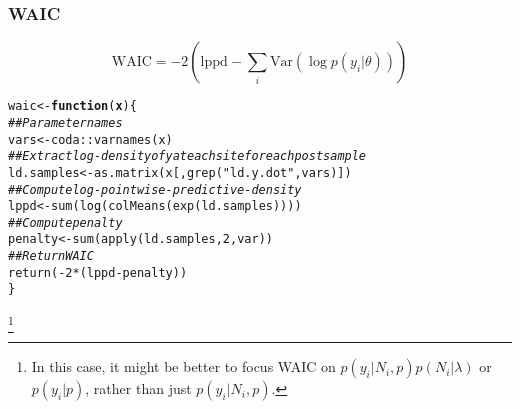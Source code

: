 \documentclass[color=usenames,dvipsnames]{beamer}\usepackage[]{graphicx}\usepackage[]{color}
\makeatletter
\newcommand{\hlnum}[1]{\textcolor[rgb]{0.69,0.494,0}{#1}}%
\newcommand{\hlstr}[1]{\textcolor[rgb]{0.749,0.012,0.012}{#1}}%
\newcommand{\hlcom}[1]{\textcolor[rgb]{0.514,0.506,0.514}{\textit{#1}}}%
\newcommand{\hlopt}[1]{\textcolor[rgb]{0,0,0}{#1}}%
\newcommand{\hlstd}[1]{\textcolor[rgb]{0,0,0}{#1}}%
\newcommand{\hlkwa}[1]{\textcolor[rgb]{0,0,0}{\textbf{#1}}}%
\newcommand{\hlkwb}[1]{\textcolor[rgb]{0,0.341,0.682}{#1}}%
\newcommand{\hlkwc}[1]{\textcolor[rgb]{0,0,0}{\textbf{#1}}}%
\newcommand{\hlkwd}[1]{\textcolor[rgb]{0.004,0.004,0.506}{#1}}%
\newenvironment{kframe}{%
 \def\at@end@of@kframe{}%
 \ifinner\ifhmode%
  \def\at@end@of@kframe{\end{minipage}}%
  \begin{minipage}{\columnwidth}%
 \fi\fi%
 \def\FrameCommand##1{\hskip\@totalleftmargin \hskip-\fboxsep
 \colorbox{shadecolor}{##1}\hskip-\fboxsep
     \hskip-\linewidth \hskip-\@totalleftmargin \hskip\columnwidth}%
 \MakeFramed {\advance\hsize-\width
   \@totalleftmargin\z@ \linewidth\hsize
   \@setminipage}}%
 {\par\unskip\endMakeFramed%
 \at@end@of@kframe}
\newenvironment{knitrout}{}{} %
\makeatother
\begin{document}
\bgroup
\let\oldfootnoterule\footnoterule
\def\footnoterule{\only<2->\oldfootnoterule}
\begin{frame}[fragile]
  \frametitle{WAIC}
  \[
    \mathrm{WAIC} = -2(\mathrm{lppd} - \sum_i \mathrm{Var}(\log p(y_i|\theta)))
  \]

\begin{knitrout}\footnotesize
{}\color{fgcolor}\begin{kframe}
\begin{alltt}
\hlstd{waic} \hlkwb{<-} \hlkwa{function}\hlstd{(}\hlkwc{x}\hlstd{) \{}
    \hlcom{## Parameter names}
    \hlstd{vars} \hlkwb{<-} \hlstd{coda}\hlopt{::}\hlkwd{varnames}\hlstd{(x)}
    \hlcom{## Extract log-density of y at each site for each post sample}
    \hlstd{ld.samples} \hlkwb{<-} \hlkwd{as.matrix}\hlstd{(x[,}\hlkwd{grep}\hlstd{(}\hlstr{"ld.y.dot"}\hlstd{, vars)])}
    \hlcom{## Compute log-pointwise-predictive-density}
    \hlstd{lppd} \hlkwb{<-} \hlkwd{sum}\hlstd{(}\hlkwd{log}\hlstd{(}\hlkwd{colMeans}\hlstd{(}\hlkwd{exp}\hlstd{(ld.samples))))}
    \hlcom{## Compute penalty}
    \hlstd{penalty} \hlkwb{<-} \hlkwd{sum}\hlstd{(}\hlkwd{apply}\hlstd{(ld.samples,} \hlnum{2}\hlstd{, var))}
    \hlcom{## Return WAIC}
    \hlkwd{return}\hlstd{(}\hlopt{-}\hlnum{2}\hlopt{*}\hlstd{(lppd}\hlopt{-}\hlstd{penalty))}
\hlstd{\}}
\end{alltt}
\end{kframe}
\end{knitrout}
\let\thefootnote\relax\footnote<2->{In this case, it might be better to focus WAIC on
$p(y_i|N_i,p)p(N_i|\lambda)$ or $p(y_i|p)$, rather than just $p(y_i|N_i,p)$.} 
\end{frame}
\egroup


\end{document}
